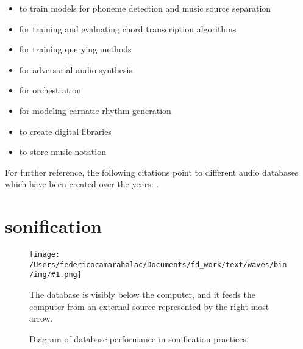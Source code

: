 \documentclass[
]{book}
\newcommand{\img}[4]{
\begin{figure}[!htbp]
\centering
\texttt{[image: /Users/federicocamarahalac/Documents/fd\_work/text/waves/bin/img/\#1.png]}
\caption{#4}
\label{img:#1}
#3
\end{figure}
\FloatBarrier
}
\begin{document}
\begin{itemize}
\item to train models for phoneme detection \parencite{DBLP:conf/ismir/ProutskovaRWC12} and music source separation \parencite{marius_miron_2017_1401923}
\item for training and evaluating chord transcription algorithms \parencite{DBLP:conf/ismir/EremenkoDBS18}
\item for training querying methods \parencites{mark_cartwright_2012_850060}{DBLP:journals/corr/Brzezinski-SpiczakDLP13}{DBLP:journals/corr/NagaviB14}{DBLP:journals/corr/abs-1301-1894}{icmc/bbp2372.1999.355} 


\item for adversarial audio synthesis \parencite{2018arXiv180204208D}
\item for orchestration \parencite{DBLP:conf/ismir/CrestelEHM17}
\item for modeling carnatic rhythm generation \parencite{carlos_guedes_2018_1422615}

\item to create digital libraries \parencite{DBLP:conf/ismir/Dunn00}
\item to store music notation \parencite{DBLP:conf/ismir/Good00}
\end{itemize}

For further reference, the following citations point to different audio databases which have been created over the years: \textcites{DBLP:conf/ismir/GotoHNO02}{DBLP:conf/ismir/GotoHNO03}{DBLP:conf/ismir/WustC04}{DBLP:conf/ismir/MaxwellE08}{DBLP:conf/ismir/Bertin-MahieuxEWL11}{DBLP:conf/ismir/Karaosmanoglu12}{Jaimovich:2012}{Mital:2013}{bbortz:2015}{jjaimovich:2015,Nort2016}{ DBLP:conf/ismir/DefferrardBVB17}{DBLP:conf/ismir/VigliensoniF17}{DBLP:conf/ismir/Meseguer-Brocal18}{DBLP:conf/ismir/DonahueMM18}{DBLP:conf/ismir/XiBPYB18}{DBLP:conf/ismir/WilkinsSWP18}.


\section{sonification}

\img{sonif}{0.3}{
	The database is visibly below the computer, and it feeds the computer from an external source represented by the right-most arrow.
}{Diagram of database performance in sonification practices.}
\end{document}
